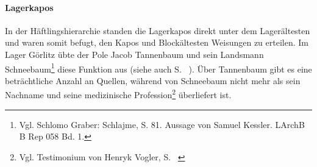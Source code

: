 \paragraph{Lagerkapos}
In der Häftlingshierarchie standen die Lagerkapos direkt unter dem Lagerältesten und waren somit befugt, den Kapos und Blockältesten Weisungen zu erteilen.
Im Lager Görlitz übte der Pole Jacob Tannenbaum und sein Landsmann Schneebaum\footnote{Vgl. Schlomo Graber: Schlajme, S. 81. Aussage von Samuel Kessler. LArchB B Rep 058 Bd. 1.} diese Funktion aus (siehe auch S. ~\pageref{kapos_ahndung}). Über Tannenbaum gibt es eine beträchtliche Anzahl an Quellen, während von Schneebaum nicht mehr als sein Nachname und seine medizinische Profession\footnote{Vgl. Testimonium von Henryk Vogler, S. ~\pageref{vogler}} überliefert ist.

